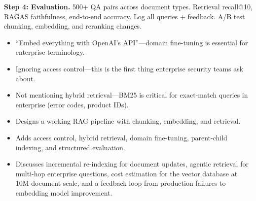 \begin{interviewq}
\textbf{Step 4: Evaluation.} 500+ QA pairs across document types. Retrieval recall@10, RAGAS faithfulness, end-to-end accuracy. Log all queries + feedback. A/B test chunking, embedding, and reranking changes.

\redflags
\begin{itemize}
    \item ``Embed everything with OpenAI's API''---domain fine-tuning is essential for enterprise terminology.
    \item Ignoring access control---this is the first thing enterprise security teams ask about.
    \item Not mentioning hybrid retrieval---BM25 is critical for exact-match queries in enterprise (error codes, product IDs).
\end{itemize}


\goodgreat
\begin{itemize}
    \item {} Designs a working RAG pipeline with chunking, embedding, and retrieval.
    \item {} Adds access control, hybrid retrieval, domain fine-tuning, parent-child indexing, and structured evaluation.
    \item {} Discusses incremental re-indexing for document updates, agentic retrieval for multi-hop enterprise questions, cost estimation for the vector database at 10M-document scale, and a feedback loop from production failures to embedding model improvement.
\end{itemize}

\end{interviewq}


